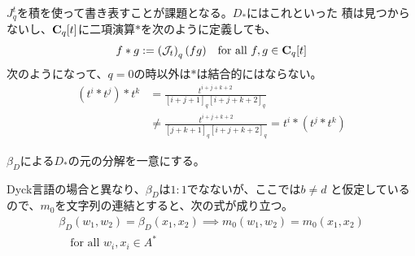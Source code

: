 {	\begin{todo}[課題]\label{todo:課題} %
		$J_q^t$を積を使って書き表すことが課題となる。$D_*$にはこれといった
		積は見つからないし、$\mathbf{C}_q[t]$に二項演算$*$を次のように定義しても、
		\begin{equation*}\begin{split}
			f*g := \mathinner{\left({{\ensuremath{{\mathcal{J}}}}_t}\right)}_q(fg) \quad\text{for all } f,g\in\mathbf{C}_q[t]
		\end{split}\end{equation*}
		次のようになって、$q=0$の時以外は$*$は結合的にはならない。
		\begin{equation*}\begin{split}
			(t^i*t^j)*t^k &= \frac{t^{i+j+k+2}}{[i+j+1]_q[i+j+k+2]_q} \\
			&\neq \frac{t^{i+j+k+2}}{[j+k+1]_q[i+j+k+2]_q} = t^i*(t^j*t^k)
		\end{split}\end{equation*}
	\end{todo} %

	\begin{todo}[修正]\label{todo:修正} %
		$\beta_D$による$D_*$の元の分解を一意にする。
	\end{todo} %
	Dyck言語の場合と異なり、$\beta_D$は$1:1$でなないが、ここでは$b\neq d$
	と仮定しているので、$m_0$を文字列の連結とすると、次の式が成り立つ。
	\begin{equation}\label{eq:Dの曖昧さ}\begin{split}
		\beta_D(w_1, w_2) = \beta_D(x_1, x_2) 
		\implies m_0(w_1, w_2) = m_0(x_1, x_2) \\
		\quad\text{for all } w_i,x_i\in A^*
	\end{split}\end{equation}

}
